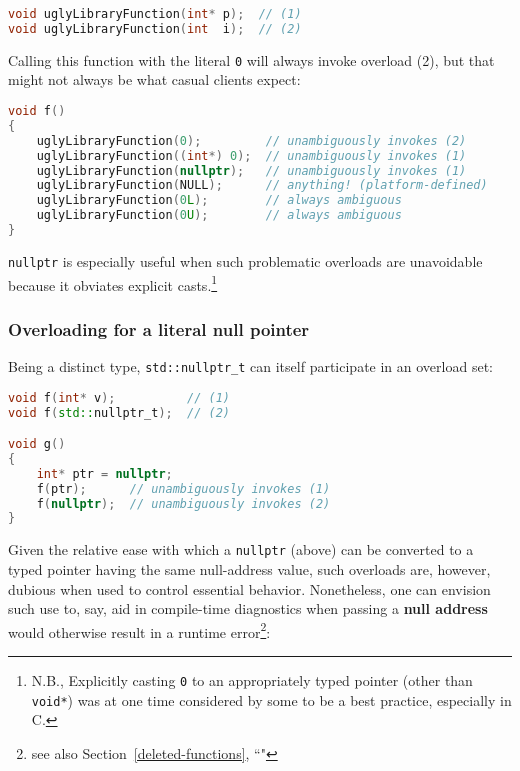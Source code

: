 \begin{lstlisting}[language=C++]
void uglyLibraryFunction(int* p);  // (1)
void uglyLibraryFunction(int  i);  // (2)
\end{lstlisting}
    

\noindent Calling this function with the literal \texttt{0} will always invoke
overload (2), but that might not always be what casual clients expect:

\begin{lstlisting}[language=C++]
void f()
{
    uglyLibraryFunction(0);         // unambiguously invokes (2)
    uglyLibraryFunction((int*) 0);  // unambiguously invokes (1)
    uglyLibraryFunction(nullptr);   // unambiguously invokes (1)
    uglyLibraryFunction(NULL);      // anything! (platform-defined)
    uglyLibraryFunction(0L);        // always ambiguous
    uglyLibraryFunction(0U);        // always ambiguous
}
\end{lstlisting}
    

\noindent\texttt{nullptr} is especially useful when such problematic overloads
are unavoidable because it obviates explicit
casts.{\cprotect\footnote{N.B., Explicitly casting \texttt{0} to an
appropriately typed pointer (other than \texttt{void*}) was at one
  time considered by some to be a best practice, especially in C.}}

\subsubsection[Overloading for a literal null pointer]{Overloading for a literal null pointer}\label{overloading-for-a-literal-null-pointer}

Being a distinct type, \texttt{std::nullptr\_t} can itself participate
in an overload set:

\begin{lstlisting}[language=C++]
void f(int* v);          // (1)
void f(std::nullptr_t);  // (2)

void g()
{
    int* ptr = nullptr;
    f(ptr);      // unambiguously invokes (1)
    f(nullptr);  // unambiguously invokes (2)
}
\end{lstlisting}
    

\noindent Given the relative ease with which a \texttt{nullptr} (above) can be
converted to a typed pointer having the same null-address value, such
overloads are, however, dubious when used to control essential behavior.
Nonetheless, one can envision such use to, say, aid in compile-time
diagnostics when passing a \textbf{null address} would otherwise result in
a runtime error\footnote{see also Section~\ref{deleted-functions}, ``"}:

